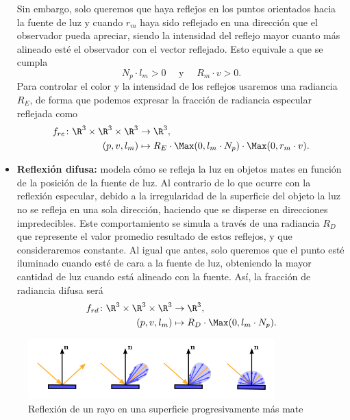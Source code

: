 \begin{itemize}
    Sin embargo, solo queremos que haya reflejos en los puntos orientados hacia la fuente de luz y cuando $r_m$ haya sido reflejado en una dirección que el observador pueda apreciar, siendo la intensidad del reflejo mayor cuanto más alineado esté el observador con el vector reflejado. Esto equivale a que se cumpla
    \begin{equation*}
        N_p\cdot l_m >0 \quad \text{ y }\quad  R_m \cdot v>0.
    \end{equation*}
    Para controlar el color y la intensidad de los reflejos usaremos una radiancia $R_E$, de forma que podemos expresar la fracción de radiancia especular reflejada como
    \begin{align*}
        f_{re} \colon \R^3\times \R^3\times \R^3 &\to \R^3,\\
        (p,v,l_m) &\mapsto R_E \cdot \Max(0,l_m\cdot N_p) \cdot \Max(0,r_m \cdot v).
    \end{align*}
    \item \textbf{Reflexión difusa:} modela cómo se refleja la luz en objetos mates en función de la posición de la fuente de luz. Al contrario de lo que ocurre con la reflexión especular, debido a la irregularidad de la superficie del objeto la luz no se refleja en una sola dirección, haciendo que se disperse en direcciones impredecibles. Este comportamiento se simula a través de una radiancia $R_D$ que represente el valor promedio resultado de estos reflejos, y que consideraremos constante. Al igual que antes, solo queremos que el punto esté iluminado cuando esté de cara a la fuente de luz, obteniendo la mayor cantidad de luz cuando está alineado con la fuente. Así, la fracción de radiancia difusa será
    \begin{align*}
        f_{rd} \colon \R^3\times \R^3\times \R^3 &\to \R^3,\\
        (p,v,l_m) &\mapsto R_D\cdot \Max(0,l_m \cdot N_p).
    \end{align*}
\end{itemize}

\begin{figure}[ht!]
    \centering
    \includegraphics[width=0.85\textwidth]{Plantilla-TFG-master/img/glossyTodiffuse.png}
    \caption{Reflexión de un rayo en una superficie progresivamente más mate \cite{especular}}
    \label{fig:miss}
\end{figure}

